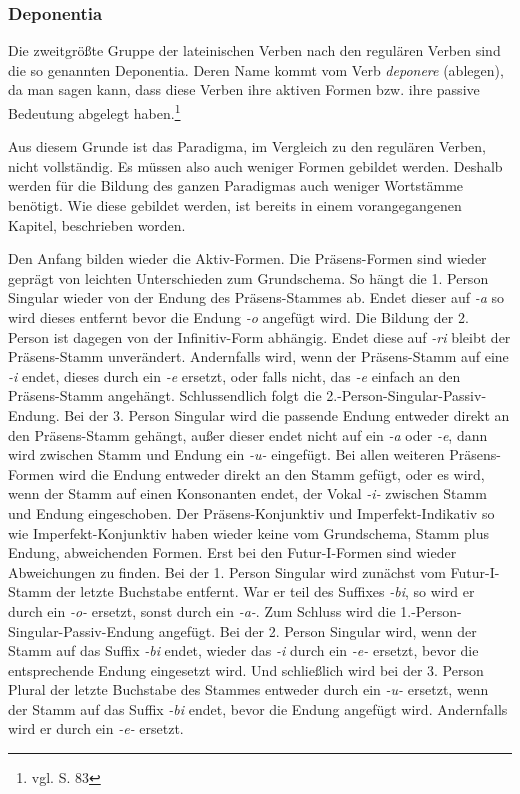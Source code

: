 \documentclass[fontsize=12pt,abstract=on,titlepage,bibliography=totoc,ngerman,listof=totoc]{scrreprt}
\begin{document}
\subsubsection{Deponentia}
Die zweitgrößte Gruppe der lateinischen Verben nach den regulären Verben sind die so genannten Deponentia. Deren Name kommt vom Verb \textit{deponere} (ablegen), da man sagen kann, dass diese Verben ihre aktiven Formen bzw. ihre passive Bedeutung abgelegt haben.\footnote{vgl. \cite{BAYER-LINDAUER1994} S. 83} \par
Aus diesem Grunde ist das Paradigma, im Vergleich zu den regulären Verben, nicht vollständig. Es müssen also auch weniger Formen gebildet werden. Deshalb werden für die Bildung des ganzen Paradigmas auch weniger Wortstämme benötigt. Wie diese gebildet werden, ist bereits in einem vorangegangenen Kapitel, beschrieben worden. \par
Den Anfang bilden wieder die Aktiv-Formen. Die Präsens-Formen sind wieder geprägt von leichten Unterschieden zum Grundschema. So hängt die 1. Person Singular wieder von der Endung des Präsens-Stammes ab. Endet dieser auf \textit{-a} so wird dieses entfernt bevor die Endung \textit{-o} angefügt wird. Die Bildung der 2. Person ist dagegen von der Infinitiv-Form abhängig. Endet diese auf \textit{-ri} bleibt der Präsens-Stamm unverändert. Andernfalls wird, wenn der Präsens-Stamm auf eine \textit{-i} endet, dieses durch ein \textit{-e} ersetzt, oder falls nicht, das \textit{-e} einfach an den Präsens-Stamm angehängt. Schlussendlich folgt die 2.-Person-Singular-Passiv-Endung. Bei der 3. Person Singular wird die passende Endung entweder direkt an den Präsens-Stamm gehängt, außer dieser endet nicht auf ein \textit{-a} oder \textit{-e}, dann wird zwischen Stamm und Endung ein \textit{-u-} eingefügt. Bei allen weiteren Präsens-Formen wird die Endung entweder direkt an den Stamm gefügt, oder es wird, wenn der Stamm auf einen Konsonanten endet, der Vokal \textit{-i-} zwischen Stamm und Endung eingeschoben. Der Präsens-Konjunktiv und Imperfekt-Indikativ so wie Imperfekt-Konjunktiv haben wieder keine vom Grundschema, Stamm plus Endung, abweichenden Formen. Erst bei den Futur-I-Formen sind wieder Abweichungen zu finden. Bei der 1. Person Singular wird zunächst vom Futur-I-Stamm der letzte Buchstabe entfernt. War er teil des Suffixes \textit{-bi}, so wird er durch ein \textit{-o-} ersetzt, sonst durch ein \textit{-a-}. Zum Schluss wird die 1.-Person-Singular-Passiv-Endung angefügt. Bei der 2. Person Singular wird, wenn der Stamm auf das Suffix \textit{-bi} endet, wieder das \textit{-i} durch ein \textit{-e-} ersetzt, bevor die entsprechende Endung eingesetzt wird. Und schließlich wird bei der 3. Person Plural der letzte Buchstabe des Stammes entweder durch ein \textit{-u-} ersetzt, wenn der Stamm auf das Suffix \textit{-bi} endet, bevor die Endung angefügt wird. Andernfalls wird er durch ein \textit{-e-} ersetzt. \par
\end{document}
